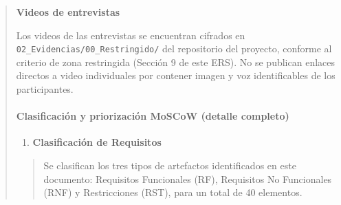 \documentclass[
]{article}
\begin{document}
\begin{quote}
\textbf{Videos de entrevistas}

Los videos de las entrevistas se encuentran cifrados en
\texttt{02\_Evidencias/00\_Restringido/} del repositorio del proyecto,
conforme al criterio de zona restringida (Sección 9 de este ERS). No se
publican enlaces directos a video individuales por contener imagen y
voz identificables de los participantes.

\paragraph{Clasificación y priorización MoSCoW (detalle
completo)}\label{clasificaciuxf3n-y-priorizaciuxf3n-moscow-detalle-completo}

\begin{enumerate}
\def\labelenumi{\arabic{enumi}.}
\item
  \protect{}\label{_bookmark101}{}\textbf{Clasificación de
  Requisitos}
\end{enumerate}

\begin{quote}
Se clasifican los tres tipos de artefactos identificados en este
documento: Requisitos Funcionales (RF), Requisitos No Funcionales (RNF)
y Restricciones (RST), para un total de 40 elementos.
\end{quote}


\end{quote}
\end{document}
